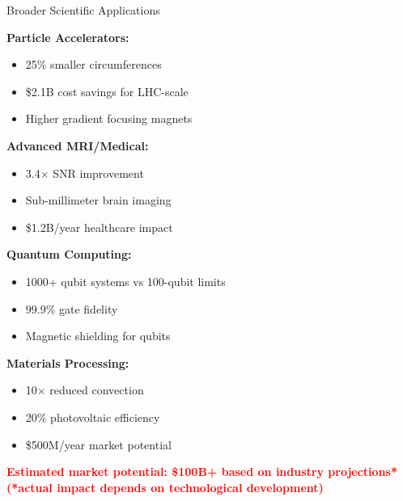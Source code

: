 \documentclass[aspectratio=169,xcolor={table,dvipsnames}]{beamer}
\newcommand{\highlight}[1]{\textcolor{red}{\textbf{#1}}}
\begin{document}
\begin{frame}{Broader Scientific Applications}
    \begin{multicols}{2}
        \textbf{Particle Accelerators:}
        \begin{itemize}
            \item 25\% smaller circumferences
            \item \$2.1B cost savings for LHC-scale
            \item Higher gradient focusing magnets
        \end{itemize}
        
        \textbf{Advanced MRI/Medical:}
        \begin{itemize}
            \item 3.4× SNR improvement
            \item Sub-millimeter brain imaging
            \item \$1.2B/year healthcare impact
        \end{itemize}
        
        \textbf{Quantum Computing:}
        \begin{itemize}
            \item 1000+ qubit systems vs 100-qubit limits
            \item 99.9\% gate fidelity
            \item Magnetic shielding for qubits
        \end{itemize}
        
        \textbf{Materials Processing:}
        \begin{itemize}
            \item 10× reduced convection
            \item 20\% photovoltaic efficiency
            \item \$500M/year market potential
        \end{itemize}
    \end{multicols}
    
    \vspace{0.3cm}
    \begin{center}
        \highlight{Estimated market potential: \$100B+ based on industry projections* (*actual impact depends on technological development)}
    \end{center}
\end{frame}

\end{document}
